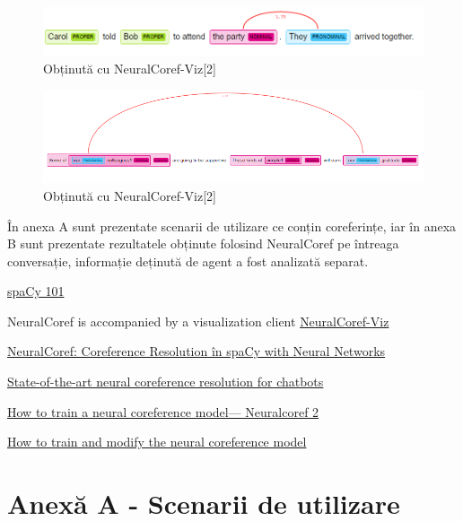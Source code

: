\documentclass[letterpaper,12pt, dvipsnames, dateno]{article}
\begin{document}
\begin{figure}[ht]
    \includegraphics[scale=0.70]{coref2.PNG}
    \caption{Obținută cu NeuralCoref-Viz[2]}
    \label{fig:my_label}
\end{figure}

\begin{figure}[ht]
    \includegraphics[scale=0.70]{coref3.PNG}
    \caption{Obținută cu NeuralCoref-Viz[2]}
    \label{fig:my_label}
\end{figure}

În anexa A sunt prezentate scenarii de utilizare ce conțin coreferințe, iar în anexa B sunt prezentate rezultatele obținute folosind NeuralCoref pe întreaga conversație, informație deținută de agent a fost analizată separat. 

\begin{thebibliography}{99}

 \href{https://spacy.io/usage/spacy-101}{spaCy 101}

 NeuralCoref is accompanied by a visualization client  \href{https://huggingface.co/coref/}{NeuralCoref-Viz}

 \href{https://github.com/huggingface/neuralcoref}{NeuralCoref: Coreference Resolution în spaCy with Neural Networks}

 \href{https://bit.ly/2DMo8RP}{State-of-the-art neural coreference resolution for chatbots}

 \href{https://bit.ly/2DWBcAT}{How to train a neural coreference model— Neuralcoref 2}

 \href{https://github.com/huggingface/neuralcoref/blob/master/neuralcoref/train/training.md}{How to train and modify the neural coreference model}


\end{thebibliography}

\section{Anexă A - Scenarii de utilizare }
\end{document}
